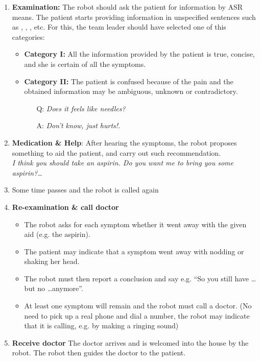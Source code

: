 \begin{enumerate}
\item \textbf{Examination:} The robot should ask the patient for information by ASR means. The patient starts providing information in unspecified sentences such as , , ,  etc. For this, the team leader should have selected one of this categories:
\begin{itemize}
\item \textbf{Category I:} All the information provided by the patient is true, concise, and she is certain of all the symptoms.
\item \textbf{Category II:} The patient is confused because of the pain and the obtained information  may be ambiguous, unknown or contradictory. %
\begin{itemize}
\item[Q:] \textit{Does it feels like needles?}
\item[A:] \textit{Don't know, just hurts!.}
\end{itemize}
\end{itemize}
\item \textbf{Medication \& Help}: After hearing the symptoms, the robot proposes something to aid the patient, and carry out such recommendation.\\ \textit{I think you should take an aspirin. Do you want me to bring you some aspirin?\dots}
\item Some time passes and the robot is called again
\item \textbf{Re-examination \& call doctor} 
\begin{itemize}
 \item The robot asks for each symptom whether it went away with the given aid (e.g. the aspirin).
 \item The patient may indicate that a symptom went away with nodding or shaking her head. 
 \item The robot must then report a conclusion and say e.g. ``So you still have \dots but no \dots anymore''.
 \item At least one symptom will remain and the robot must call a doctor. 
  (No need to pick up a real phone and dial a number, the robot may indicate that it is calling, e.g. by making a ringing sound)
\end{itemize}
\item \textbf{Receive doctor} The doctor arrives and is welcomed into the house by the robot. The robot then guides the doctor to the patient.

\end{enumerate}
